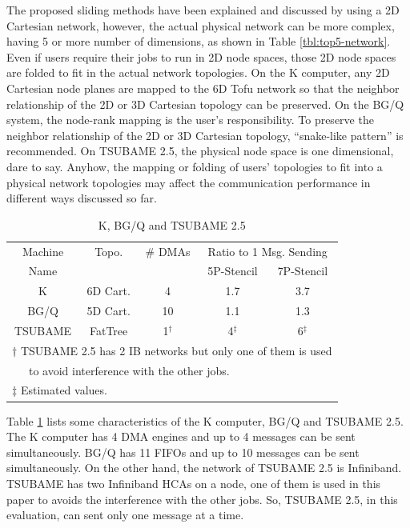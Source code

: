\documentclass[Afour,times,sageh]{sagej}
\begin{document}
The proposed sliding methods have been explained and discussed by
using a 2D Cartesian network, however, the actual physical network can
be more complex, having 5 or more number of dimensions, as shown in
Table \ref{tbl:top5-network}. Even if users
require their jobs to run in 2D node spaces, those 2D node spaces
are folded to fit in the actual network topologies. On the K computer,
any 2D Cartesian node planes are mapped to the 6D Tofu network so that
the neighbor relationship of the 2D or 3D Cartesian topology can be
preserved. On the BG/Q system, the node-rank mapping is the user's
responsibility. To preserve the neighbor relationship of the 2D or 3D
Cartesian topology, ``snake-like pattern'' is
recommended\citep{BGQ-softdev}. On TSUBAME 2.5, the physical node
space is one dimensional, dare to say. Anyhow, the
mapping or folding of users' topologies to fit into a physical network
topologies may affect the communication performance in different ways
discussed so far.

\begin{table}[htb]
\centering
\caption{K, BG/Q and TSUBAME 2.5}
\label{tbl:machines}
{\small
\begin{tabular}{c|c|c|c|c}
\hline
Machine & Topo. & \# DMAs &\multicolumn{2}{c}{Ratio to 1 Msg. Sending}\\
Name & &  & 5P-Stencil & 7P-Stencil \\
\hline
K & 6D Cart. & 4 & 1.7 & 3.7 \\
BG/Q\citep{Chen:2011:IBG:2063384.2063419} & 5D Cart. & 10 & 1.1 & 1.3 \\
TSUBAME & FatTree & 1$^{\dagger}$ & 4$^{\ddagger}$ & 6$^{\ddagger}$ \\
\hline
\multicolumn{5}{l}{\footnotesize $\dagger$ TSUBAME 2.5 has 2 IB
  networks but only one of them is used} \\
\multicolumn{5}{l}{\footnotesize ~~~to avoid
  interference with the other jobs.} \\
\multicolumn{5}{l}{\footnotesize $\ddagger$ Estimated values.} \\
\end{tabular}
}
\end{table}

Table \ref{tbl:machines} lists some characteristics of the K computer,
BG/Q and TSUBAME 2.5. The K computer has 4 DMA engines and up to 4
messages can be sent simultaneously. BG/Q has 11 FIFOs and up to 10
messages can be sent simultaneously. On the other hand, the network of
TSUBAME 2.5 is Infiniband\citep{infiniband}. TSUBAME has two
Infiniband HCAs on a node, one of them is used in this paper to avoids
the interference with the other jobs. So, TSUBAME 2.5, in this
evaluation, can sent only one message at a time.
\end{document}
